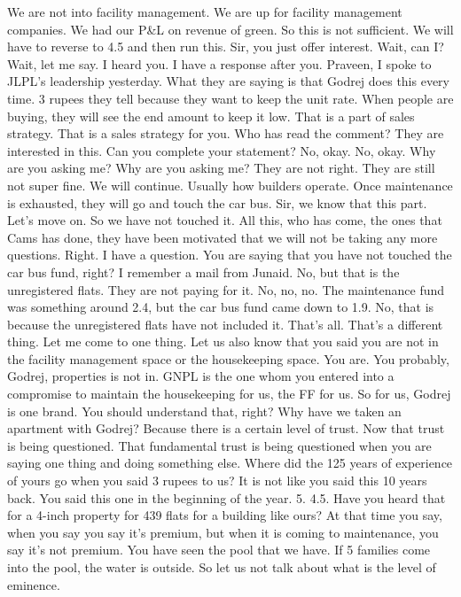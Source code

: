 We are not into facility management.
We are up for facility management companies.
We had our P\&L on revenue of green.
So this is not sufficient.
We will have to reverse to 4.5 and then run this.
Sir, you just offer interest.
Wait, can I?
Wait, let me say.
I heard you.
I have a response after you.
Praveen, I spoke to JLPL's leadership yesterday.
What they are saying is that Godrej does this every time.
3 rupees they tell because they want to keep the unit rate.
When people are buying, they will see the end amount to keep it low.
That is a part of sales strategy.
That is a sales strategy for you.
Who has read the comment?
They are interested in this.
Can you complete your statement?
No, okay.
No, okay.
Why are you asking me?
Why are you asking me?
They are not right.
They are still not super fine.
We will continue.
Usually how builders operate.
Once maintenance is exhausted, they will go and touch the car bus.
Sir, we know that this part.
Let's move on.
So we have not touched it.
All this, who has come, the ones that Cams has done,
they have been motivated that we will not be taking any more questions.
Right.
I have a question.
You are saying that you have not touched the car bus fund, right?
I remember a mail from Junaid.
No, but that is the unregistered flats.
They are not paying for it.
No, no, no.
The maintenance fund was something around 2.4,
but the car bus fund came down to 1.9.
No, that is because the unregistered flats have not included it.
That's all.
That's a different thing.
Let me come to one thing.
Let us also know that you said you are not in the facility management space
or the housekeeping space.
You are.
You probably, Godrej, properties is not in.
GNPL is the one whom you entered into a compromise
to maintain the housekeeping for us, the FF for us.
So for us, Godrej is one brand.
You should understand that, right?
Why have we taken an apartment with Godrej?
Because there is a certain level of trust.
Now that trust is being questioned.
That fundamental trust is being questioned
when you are saying one thing and doing something else.
Where did the 125 years of experience of yours go
when you said 3 rupees to us?
It is not like you said this 10 years back.
You said this one in the beginning of the year.
5.
4.5.
Have you heard that for a 4-inch property for 439 flats
for a building like ours?
At that time you say, when you say you say it's premium,
but when it is coming to maintenance,
you say it's not premium.
You have seen the pool that we have.
If 5 families come into the pool, the water is outside.
So let us not talk about what is the level of eminence.
